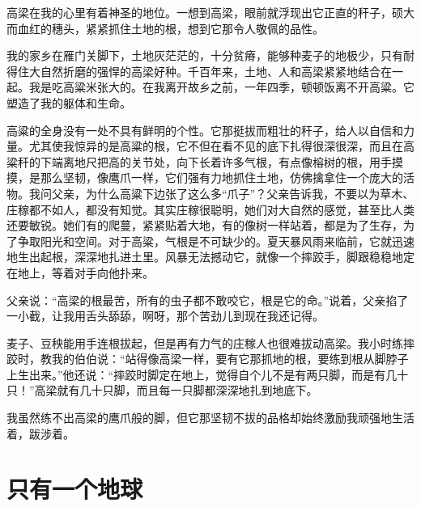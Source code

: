 \documentclass[12pt,UTF-8,openany]{ctexbook}
\begin{document}
\begin{large}
    
    高梁在我的心里有着神圣的地位。一想到高梁，眼前就浮现出它正直的秆子，硕大而血红的穗头，紧紧抓住土地的根，想到它那令人敬佩的品性。
    
    我的家乡在雁门关脚下，土地灰茫茫的，十分贫瘠，能够种麦子的地极少，只有耐得住大自然折磨的强悍的高梁好种。千百年来，土地、人和高梁紧紧地结合在一起。我是吃高粱米张大的。在我离开故乡之前，一年四季，顿顿饭离不开高粱。它塑造了我的躯体和生命。
    
    高粱的全身没有一处不具有鲜明的个性。它那挺拔而粗壮的秆子，给人以自信和力量。尤其使我惊异的是高粱的根，它不但在看不见的底下扎得很深很深，而且在高粱秆的下端离地尺把高的关节处，向下长着许多气根，有点像榕树的根，用手摸摸，是那么坚韧，像鹰爪一样，它们强有力地抓住土地，仿佛擒拿住一个庞大的活物。我问父亲，为什么高粱下边张了这么多“爪子”？父亲告诉我，不要以为草木、庄稼都不如人，都没有知觉。其实庄稼很聪明，她们对大自然的感觉，甚至比人类还要敏锐。她们有的爬蔓，紧紧贴着大地，有的像树一样站着，都是为了生存，为了争取阳光和空间。对于高粱，气根是不可缺少的。夏天暴风雨来临前，它就迅速地生出起根，深深地扎进土里。风暴无法撼动它，就像一个摔跤手，脚跟稳稳地定在地上，等着对手向他扑来。
    
    父亲说：“高梁的根最苦，所有的虫子都不敢咬它，根是它的命。”说着，父亲掐了一小截，让我用舌头舔舔，啊呀，那个苦劲儿到现在我还记得。
    
    麦子、豆秧能用手连根拔起，但是再有力气的庄稼人也很难拔动高梁。我小时练摔跤时，教我的伯伯说：“站得像高梁一样，要有它那抓地的根，要练到根从脚脖子上生出来。”他还说：“摔跤时脚定在地上，觉得自个儿不是有两只脚，而是有几十只！”高梁就有几十只脚，而且每一只脚都深深地扎到地底下。
    
    我虽然练不出高梁的鹰爪般的脚，但它那坚韧不拔的品格却始终激励我顽强地生活着，跋涉着。
    
\end{large}



\chapter{只有一个地球}
\end{document}
